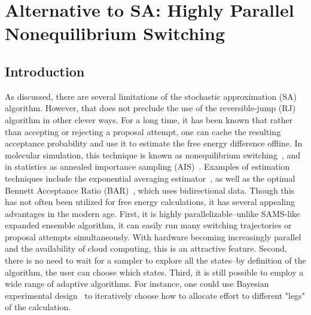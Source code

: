 \chapter{Alternative to SA: Highly Parallel Nonequilibrium Switching}

\section{Introduction}
%
As discussed, there are several limitations of the stochastic approximation (SA) algorithm.
%
However, that does not preclude the use of the reversible-jump (RJ) algorithm in other clever ways.
%
For a long time, it has been known that rather than accepting or rejecting a proposal attempt, one can cache the resulting acceptance probability and use it to estimate the free energy difference offline.
%
In molecular simulation, this technique is known as nonequilibrium switching~\cite{Hummer2001, Aldeghi2018}, and in statistics as annealed importance sampling (AIS)~\cite{Neal2001}.
%
Examples of estimation techniques include the exponential averaging estimator~\cite{Zwanzig1954}, as well as the optimal Bennett Acceptance Ratio (BAR)~\cite{Bennett1976,Shirts2005,Crooks1999Thesis, Meng1996}, which uses bidirectional data.
%
Though this has not often been utilized for free energy calculations, it has several appealing advantages in the modern age.
%
First, it is highly parallelizable--unlike SAMS-like expanded ensemble algorithm, it can easily run many switching trajectories or proposal attempts simultaneously.
%
With hardware becoming increasingly parallel and the availability of cloud computing, this is an attractive feature.
%
Second, there is no need to wait for a sampler to explore all the states--by definition of the algorithm, the user can choose which states.
%
Third, it is still possible to employ a wide range of adaptive algorithms.
%
For instance, one could use Bayesian experimental design~\cite{Vanlier2012, DasGupta1996} to iteratively choose how to allocate effort to different "legs" of the calculation.
%
